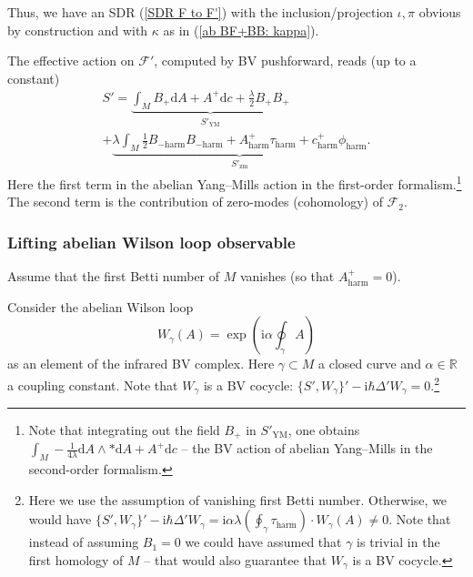 \documentclass{amsart}
\theoremstyle{plain} %
\theoremstyle{definition}
\theoremstyle{remark}
\newcommand{\mr}{\mathrm}
\newcommand{\F}{\mathcal{F}}
\newcommand{\iii}{\mathrm{i}}
\newcommand{\dr}{\mathrm{d}}
\begin{document}
Thus, we have an SDR (\ref{SDR F to F'}) with the inclusion/projection $\iota,\pi$ obvious by construction and with $\kappa$ as in (\ref{ab BF+BB: kappa}).

The effective action on $\F'$, computed by BV pushforward, reads (up to a constant)
\begin{multline}
    S'=\underbrace{\int_M B_+\dr A + A^+ \dr c +\frac{\lambda}{2} B_+ B_+}_{S'_\mr{YM}} \\
    + \underbrace{\lambda\int_M \frac12 B_{-\mr{harm}} B_{-\mr{harm}} +A^+_\mr{harm} \tau_\mr{harm} + c^+_\mr{harm} \phi_\mr{harm}
    }_{S'_\mr{zm}}.
\end{multline}
Here the first term in the abelian Yang--Mills action in the first-order formalism.\footnote{Note that integrating out the field $B_+$ in $S'_\mr{YM}$, one obtains $\displaystyle \int_M -\frac{1}{4\lambda} \dr A\wedge *\dr A + A^+\dr c $ -- the BV action of abelian Yang--Mills in the second-order formalism.} The second term is the contribution of zero-modes (cohomology) of $\F_2$.

\subsubsection{Lifting abelian Wilson loop observable}
\label{sss: lifting ab Wilson loop observable}
Assume that the first Betti number of $M$ vanishes (so that $A^+_\mr{harm}=0$).

Consider the abelian Wilson loop  
\begin{equation}
    W_\gamma(A)=\exp \left(\iii\alpha \oint_\gamma A\right)
\end{equation}
as an element of the infrared BV complex.
Here $\gamma\subset M$ a closed curve and $\alpha\in \mathbb{R}$ a coupling constant. Note that $W_\gamma$ is a BV cocycle: $\{S',W_\gamma\}'-\iii\hbar \Delta' W_\gamma=0$.\footnote{Here we use the assumption of vanishing first Betti number. Otherwise, we would have $\displaystyle \{S',W_\gamma\}'-\iii\hbar\Delta'W_\gamma=\iii\alpha \lambda \left(\oint_\gamma \tau_\mr{harm}\right)\cdot W_\gamma(A)\neq 0$. 
Note that instead of assuming $B_1=0$ we could have assumed that $\gamma$ is trivial in the first homology of $M$ -- that would also guarantee that $W_\gamma$ is a BV cocycle.
}
\end{document}
